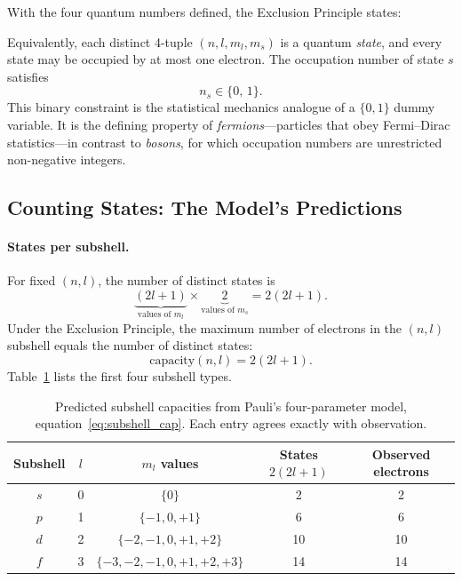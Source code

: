 \documentclass[12pt]{article}
\begin{document}
With the four quantum numbers defined, the Exclusion Principle states:

\begin{center}
\end{center}

\noindent Equivalently, each distinct 4-tuple $(n,l,m_l,m_s)$ is a quantum
\emph{state}, and every state may be occupied by at most one electron.
The occupation number of state $s$ satisfies
\begin{equation}\label{eq:occupation}
  n_s \in \{0,\,1\}.
\end{equation}
This binary constraint is the statistical mechanics analogue of a $\{0,1\}$ dummy
variable.  It is the defining property of \emph{fermions}---particles that obey
Fermi--Dirac statistics---in contrast to \emph{bosons}, for which occupation
numbers are unrestricted non-negative integers.

\subsection{Counting States: The Model's Predictions}

\paragraph{States per subshell.}
For fixed $(n,l)$, the number of distinct states is
\begin{equation}\label{eq:subshell_count}
  \underbrace{(2l+1)}_{\text{values of }m_l} \times
  \underbrace{2}_{\text{values of }m_s}
  = 2(2l+1).
\end{equation}
Under the Exclusion Principle, the maximum number of electrons in the
$(n,l)$ subshell equals the number of distinct states:
\begin{equation}\label{eq:subshell_cap}
  \text{capacity}(n,l) = 2(2l+1).
\end{equation}
Table~\ref{tab:subshell} lists the first four subshell types.

\begin{table}[ht]
\centering
\caption{Predicted subshell capacities from Pauli's four-parameter model,
equation~\eqref{eq:subshell_cap}.  Each entry agrees exactly with
observation.}
\label{tab:subshell}
\medskip
\begin{tabular}{ccccc}
\toprule
Subshell & $l$ & $m_l$ values & States $2(2l+1)$ & Observed electrons \\
\midrule
$s$ & 0 & $\{0\}$              &  2 &  2 \\
$p$ & 1 & $\{-1,0,+1\}$        &  6 &  6 \\
$d$ & 2 & $\{-2,-1,0,+1,+2\}$ & 10 & 10 \\
$f$ & 3 & $\{-3,-2,-1,0,+1,+2,+3\}$ & 14 & 14 \\
\bottomrule
\end{tabular}
\end{table}
\end{document}
